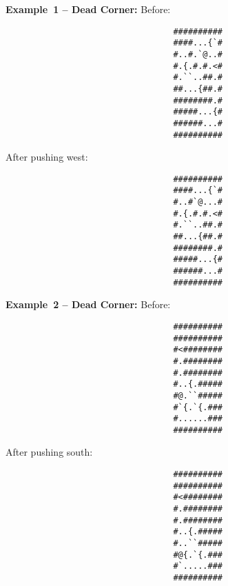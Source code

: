 \begin{MyGreenBox}
	\textbf{Example 1 – Dead Corner:} Before:
	\begin{verbatim}
                                  ##########
                                  ####...{`#
                                  #..#.`@..#
                                  #.{.#.#.<#
                                  #.``..##.#
                                  ##...{##.#
                                  ########.#
                                  #####...{#
                                  ######...#
                                  ##########
\end{verbatim}
	After pushing west: \begin{verbatim}
                                  ##########
                                  ####...{`#
                                  #..#`@...#
                                  #.{.#.#.<#
                                  #.``..##.#
                                  ##...{##.#
                                  ########.#
                                  #####...{#
                                  ######...#
                                  ##########
\end{verbatim}

	\textbf{Example 2 – Dead Corner:} Before:
	\begin{verbatim}
                                  ##########
                                  ##########
                                  #<########
                                  #.########
                                  #.########
                                  #..{.#####
                                  #@.``#####
                                  #`{.`{.###
                                  #......###
                                  ##########
\end{verbatim}
	After pushing south: \begin{verbatim}
                                  ##########
                                  ##########
                                  #<########
                                  #.########
                                  #.########
                                  #..{.#####
                                  #..``#####
                                  #@{.`{.###
                                  #`.....###
                                  ##########
\end{verbatim}


\end{MyGreenBox}
